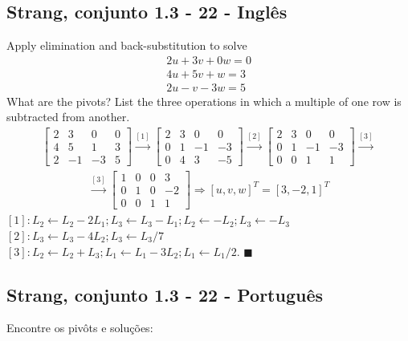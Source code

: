 \documentclass[12pt,a4paper]{article}
\newcommand{\qed}{\hfill $\blacksquare$}
\begin{document}
\subsection*{Strang, conjunto 1.3 - 22 - Inglês}
 Apply elimination and back-substitution to solve
\begin{align*}
2u + 3v + 0w =  0\\
4u + 5v + w = 3\\
2u - v - 3w = 5
\end{align*}
What are the pivots? List the three operations in which a multiple of one row is subtracted from another. 
\begin{align*}
\begin{bmatrix}
2 &  3 &  0 &   0\\
4 &  5 &  1 &  3\\
2 & -1  & - 3 &  5
\end{bmatrix}
\xrightarrow{[1]}
\begin{bmatrix}
2 &  3 &  0 &   0\\
0 &  1 &  -1 &  -3\\
0 & 4  & 3 &  -5
\end{bmatrix}
\xrightarrow{[2]}
\begin{bmatrix}
2 &  3 &  0 &   0\\
0 &  1 &  -1 &  -3\\
0 & 0  & 1 &  1
\end{bmatrix}
\xrightarrow{[3]}
\end{align*}
\begin{align*}
\xrightarrow{[3]}
\begin{bmatrix}
1 &  0 &  0 &   3\\
0 &  1 &  0 &  -2\\
0 & 0  & 1 &  1
\end{bmatrix}
\Rightarrow
[u,v,w]^T = [3, -2, 1]^T
\end{align*}
$ [1] : L_2 \leftarrow L_2 - 2L_1; L_3 \leftarrow L_3 - L_1; L_2 \leftarrow -L_2; L_3 \leftarrow -L_3 $\\
$ [2] : L_3 \leftarrow L_3 - 4L_2; L_3 \leftarrow L_3/7 $\\
$ [3] : L_2 \leftarrow L_2 + L_3; L_1 \leftarrow L_1 - 3L_2; L_1 \leftarrow L_1/2.$
\qed

\subsection*{Strang, conjunto 1.3 - 22 - Português}
Encontre os pivôts e soluções:
\end{document}
